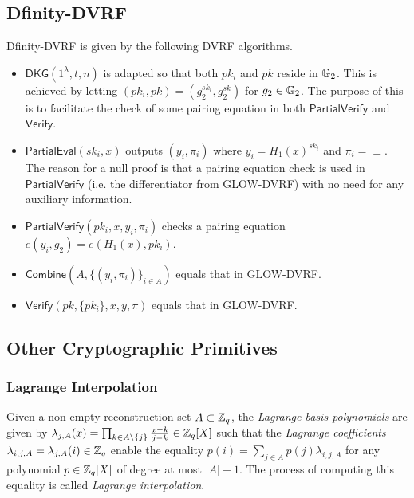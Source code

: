 \subsection{Dfinity-DVRF}
\label{appendix:dfinity-dvrf}
Dfinity-DVRF is given by the following DVRF algorithms.
\begin{itemize}
\item $\mathsf{DKG}(1^\lambda, t, n)$ is adapted so that both $pk_i$ and $pk$ reside in $\mathbb{G}_2$. This is achieved by letting $(pk_i, pk) = (g_2^{sk_i}, g_2^{sk})$ for $g_2 \in \mathbb{G}_2$. The purpose of this is to facilitate the check of some pairing equation in both $\mathsf{PartialVerify}$ and $\mathsf{Verify}$.
\item $\mathsf{PartialEval}(sk_i, x)$ outputs $(y_i, \pi_i)$ where $y_i = H_1(x)^{sk_i}$ and $\pi_i = \text{$\perp$}$. The reason for a null proof is that a pairing equation check is used in $\mathsf{PartialVerify}$ (i.e. the differentiator from GLOW-DVRF) with no need for any auxiliary information.
\item $\mathsf{PartialVerify}(pk_i, x, y_i, \pi_i)$ checks a pairing equation $e(y_i, g_2) = e(H_1(x), pk_i)$.
\item $\mathsf{Combine}(A, \{(y_i, \pi_i)\}_{i \in A})$ equals that in GLOW-DVRF.
\item $\mathsf{Verify}(pk, \{pk_i\}, x, y, \pi)$ equals that in GLOW-DVRF.
\end{itemize}

\subsection{Other Cryptographic Primitives}
\subsubsection{Lagrange Interpolation}
\label{appendix:lagrange}
Given a non-empty reconstruction set $A \subset \mathbb{Z}_q$, the \textit{Lagrange basis polynomials} are given by $\lambda_{j, A}(x) = \prod_{k \in A \setminus \{j\}} \frac{x - k}{j - k} \in \mathbb{Z}_q[X]$ such that the \textit{Lagrange coefficients} $\lambda_{i, j, A} = \lambda_{j, A}(i) \in \mathbb{Z}_q$ enable the equality $p(i) = \sum_{j \in A} p(j) \lambda_{i, j, A}$ for any polynomial $p \in \mathbb{Z}_q[X]$ of degree at most $|A| - 1$. The process of computing this equality is called \textit{Lagrange interpolation}.

